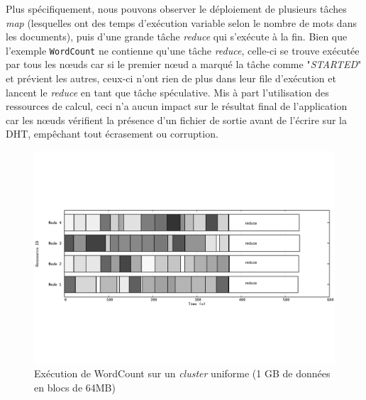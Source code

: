 Plus spécifiquement, nous pouvons observer le déploiement de plusieurs tâches \textit{map} (lesquelles ont des temps d'exécution variable selon le nombre de mots dans les documents), puis d'une grande tâche \textit{reduce} qui s'exécute à la fin. Bien que l'exemple \texttt{WordCount} ne contienne qu'une tâche \textit{reduce}, celle-ci se trouve exécutée par tous les n{\oe}uds car si le premier n{\oe}ud a marqué la tâche comme "\textit{STARTED}" et prévient les autres, ceux-ci n'ont rien de plus dans leur file d'exécution et lancent le \textit{reduce} en tant que tâche spéculative. Mis à part l'utilisation des ressources de calcul, ceci n'a aucun impact sur le résultat final de l'application car les n{\oe}uds vérifient la présence d'un fichier de sortie avant de l'écrire sur la DHT, empêchant tout écrasement ou corruption. 

\begin{figure}
	\centering
		\includegraphics[width=1\linewidth]{img/regular2}
		\caption{Exécution de WordCount sur un \textit{cluster} uniforme (1 GB de données en blocs de 64MB)}\label{fig:regular}
\end{figure}




